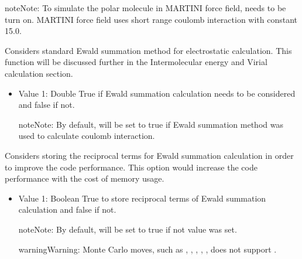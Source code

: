 \documentclass[letterpaper,10pt,english]{sphinxmanual}
\begin{document}
\begin{description}
\begin{itemize}
\begin{sphinxadmonition}{note}{Note:}
To simulate the polar molecule in MARTINI force field,  needs to be turn on. MARTINI force field uses short range coulomb interaction with constant  15.0.
\end{sphinxadmonition}

\end{itemize}

\item[{\sphinxcode{\sphinxupquote{Ewald}}}] \leavevmode
Considers standard Ewald summation method for electrostatic calculation. This function will be discussed further in the Intermolecular energy and Virial calculation section.
\begin{itemize}
\item {} 
Value 1: Double \sphinxhyphen{} True if Ewald summation calculation needs to be considered and false if not.

\begin{sphinxadmonition}{note}{Note:}
By default,  will be set to true if Ewald summation method was used to calculate coulomb interaction.
\end{sphinxadmonition}

\end{itemize}

\item[{\sphinxcode{\sphinxupquote{CachedFourier}}}] \leavevmode
Considers storing the reciprocal terms for Ewald summation calculation in order to improve the code performance. This option would increase the code performance with the cost of memory usage.
\begin{itemize}
\item {} 
Value 1: Boolean \sphinxhyphen{} True to store reciprocal terms of Ewald summation calculation and false if not.

\begin{sphinxadmonition}{note}{Note:}
By default,  will be set to true if not value was set.
\end{sphinxadmonition}

\begin{sphinxadmonition}{warning}{Warning:}
Monte Carlo moves, such as , , , , ,  does not support .
\end{sphinxadmonition}


\end{itemize}
\end{description}
\end{document}
